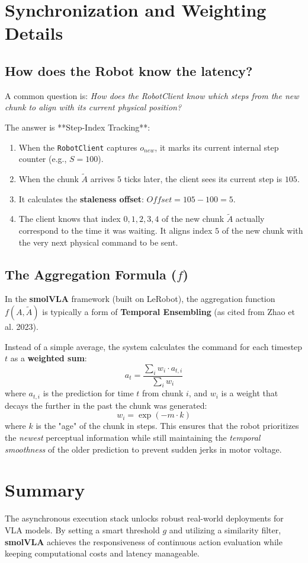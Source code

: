 \documentclass[11pt,a4paper]{article}
\begin{document}
\section{Synchronization and Weighting Details}

\subsection{How does the Robot know the latency?}
A common question is: \textit{How does the RobotClient know which steps from the new chunk to align with its current physical position?}

The answer is **Step-Index Tracking**:
\begin{enumerate}
    \item When the \texttt{RobotClient} captures $o_{new}$, it marks its current internal step counter (e.g., $S = 100$).
    \item When the chunk $\tilde{A}$ arrives $5$ ticks later, the client sees its current step is $105$.
    \item It calculates the \textbf{staleness offset}: $Offset = 105 - 100 = 5$.
    \item The client knows that index $0, 1, 2, 3, 4$ of the new chunk $\tilde{A}$ actually correspond to the time it was waiting. It aligns index $5$ of the new chunk with the very next physical command to be sent.
\end{enumerate}

\subsection{The Aggregation Formula ($f$)}
In the \textbf{smolVLA} framework (built on LeRobot), the aggregation function $f(A, \tilde{A})$ is typically a form of \textbf{Temporal Ensembling} (as cited from Zhao et al. 2023). 

Instead of a simple average, the system calculates the command for each timestep $t$ as a \textbf{weighted sum}:
\[ a_t = \frac{\sum_{i} w_i \cdot a_{t,i}}{\sum_{i} w_i} \]
where $a_{t,i}$ is the prediction for time $t$ from chunk $i$, and $w_i$ is a weight that decays the further in the past the chunk was generated:
\[ w_i = \exp(-m \cdot k) \]
where $k$ is the "age" of the chunk in steps. This ensures that the robot prioritizes the \textit{newest} perceptual information while still maintaining the \textit{temporal smoothness} of the older prediction to prevent sudden jerks in motor voltage.

\section{Summary}
The asynchronous execution stack unlocks robust real-world deployments for VLA models. By setting a smart threshold $g$ and utilizing a similarity filter, \textbf{smolVLA} achieves the responsiveness of continuous action evaluation while keeping computational costs and latency manageable.
\end{document}
